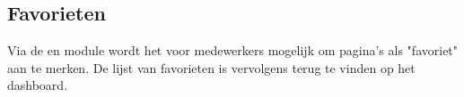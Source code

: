 \subsection{Favorieten}\label{favorieten}

Via de  en  module wordt het voor medewerkers mogelijk om pagina's als "favoriet" aan te merken. De lijst van favorieten is vervolgens terug te vinden op het dashboard.

